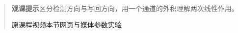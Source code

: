 \begin{quote}\small\textbf{观课提示}\quad 区分检测方向与写回方向，用一个通道的外积理解两次线性作用。

\href{https://www.youtube.com/watch?v=9-Jl0dxWQs8}{原课程视频}\quad\href{https://vitael04213.github.io/3blue1brown-notes/lessons/mlp.html}{本节网页与媒体}\quad\href{https://vitael04213.github.io/3blue1brown-notes/lab.html\#network}{参数实验}
\end{quote}
